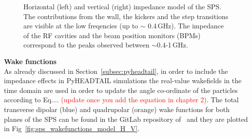 \begin{figure}[!ht]
\begin{subfigure}[t]{0.45\textwidth}
    \end{subfigure}
    \hfill
     \caption{Horizontal (left) and vertical (right) impedance model of the SPS. The contributions from the wall, the kickers and the step transitions are visible at the low freqencies (up to $\sim$ 0.4\,GHz). The impedance of the RF cavities and the beam position monitors (BPMs) correspond to the peaks observed between $\sim$0.4-1\,GHz.}
     
     \label{fig:sps_impedance_model_H_V}
 \end{figure}



\normalsize{\textbf{Wake functions}}\\
As already discussed in Section~\ref{subsec:pyheadtail}, in order to include the impedance effects in PyHEADTAIL simulations the real-value wakefields in the time domain are used in order to update the angle co-ordinate of the particles according to Eq.... \textcolor{red}{(update once you add the equation in chapter 2)}. 
The total transverse dipolar (blue) and quadrupolar (orange) wake functions for both planes of the SPS can be found in the GitLab repository of~\cite{sps_impedance_model_git} and they are plotted in Fig~\ref{fig:sps_wakefunctions_model_H_V}.


